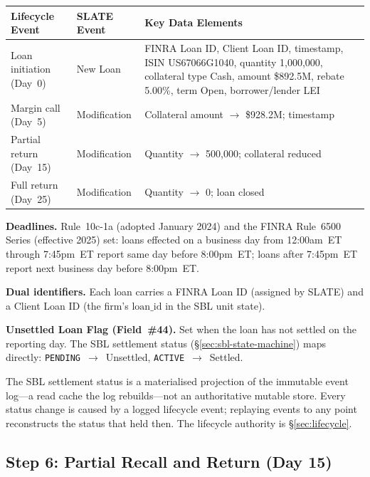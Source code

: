 \begin{center}\small
\begin{tabular}{l l p{6cm}}
\toprule
\textbf{Lifecycle Event} & \textbf{SLATE Event} & \textbf{Key Data Elements} \\
\midrule
Loan initiation (Day~0) & New Loan & FINRA Loan ID, Client Loan ID, timestamp, ISIN US67066G1040, quantity 1{,}000{,}000, collateral type Cash, amount \$892.5M, rebate 5.00\%, term Open, borrower/lender LEI \\
\midrule
Margin call (Day~5) & Modification & Collateral amount $\to$ \$928.2M; timestamp \\
\midrule
Partial return (Day~15) & Modification & Quantity $\to$ 500{,}000; collateral reduced \\
\midrule
Full return (Day~25) & Modification & Quantity $\to$ 0; loan closed \\
\bottomrule
\end{tabular}
\end{center}

\noindent\textbf{Deadlines.} Rule~10c-1a (adopted January 2024) and the FINRA Rule~6500 Series (effective 2025) set: loans effected on a business day from 12:00am~ET through 7:45pm~ET report same day before 8:00pm~ET; loans after 7:45pm~ET report next business day before 8:00pm~ET.

\noindent\textbf{Dual identifiers.} Each loan carries a FINRA Loan ID (assigned by SLATE) and a Client Loan ID (the firm's $\mathrm{loan\_id}$ in the SBL unit state).

\noindent\textbf{Unsettled Loan Flag (Field~\#44).} Set when the loan has not settled on the reporting day. The SBL settlement status (\S\ref{sec:sbl-state-machine}) maps directly: \texttt{PENDING}~$\to$~Unsettled, \texttt{ACTIVE}~$\to$~Settled.

\begin{remark}
The SBL settlement status is a materialised projection of the immutable event log---a read cache the log rebuilds---not an authoritative mutable store. Every status change is caused by a logged lifecycle event; replaying events to any point reconstructs the status that held then. The lifecycle authority is \S\ref{sec:lifecycle}.
\end{remark}

\subsection{Step 6: Partial Recall and Return (Day 15)}
\label{sec:us-step6}

